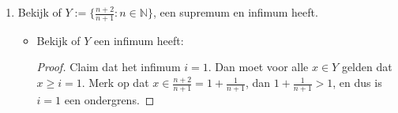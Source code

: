 \documentclass{article}
\newcommand{\f}[2]{\frac{#1}{#2}}
\newcommand{\N}{\mathbb{N}}
\begin{document}
\begin{enumerate}[label=\arabic*]
\begin{enumerate}[label=\alph*)]
\begin{enumerate}
\begin{itemize}
\begin{proof}
                                                      Nu moeten we nog laten zien dat $s = 1$ de kleinste bovengrens is.
                                                      Neem $x = 1 - \f{1}{n+2}$, dan moet gelden $\forall \epsilon > 0$ dat:
                                                      \[1 - \epsilon < x\]
                                                      Waarbij $1$ de gesuggereerde bovengrens $s$ is.
                                                      substitueer $x = 1 - \f{1}{n+2}$:
                                                      \[1 - \epsilon < 1- \f{1}{n+2}\]
                                                      Neem aan dat $\epsilon > \f{1}{n+2}$ dan is er altijd een
                                                      $x$ waarvoor epsilon groter is als we $n$ groot genoeg maken.
                                                      Hieruit volgt dus dat $s = 1$ de kleinste bovengrens moet zijn.
                                                \end{proof}
                                    \end{itemize}
                              \item Bekijk of $Y:= \{\f{n+2}{n+1}: n \in \N\}$, een supremum en infimum heeft.
                                    \begin{itemize}
                                          \item Bekijk of $Y$ een infimum heeft:
                                                \begin{proof}
                                                      Claim dat het infimum $i = 1$.
                                                      Dan moet voor alle $x \in Y$ gelden dat $x \geq i = 1$.
                                                      Merk op dat $x \in \f{n+2}{n+1} = 1 + \f{1}{n+1}$, dan
                                                      $1 + \f{1}{n+1} > 1$, en dus is $i=1$ een ondergrens.


\end{proof}
\end{itemize}
\end{enumerate}
\end{enumerate}
\end{enumerate}
\end{document}
